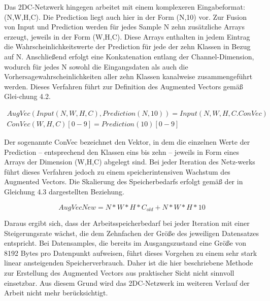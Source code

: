 Das 2DC-Netzwerk hingegen arbeitet mit einem komplexeren Eingabeformat: (N,W,H,C). Die Prediction liegt auch hier in der 
Form (N,10) vor. Zur Fusion von Input und Prediction werden für jedes Sample N zehn zusätzliche Arrays erzeugt, jeweils in der 
Form (W,H,C). Diese Arrays enthalten in jedem Eintrag die Wahrscheinlichkeitswerte der Prediction für jede der zehn Klassen in Bezug auf N. 
Anschließend erfolgt eine Konkatenation entlang der Channel-Dimension, wodurch für jedes N sowohl die Eingangsdaten als auch die 
Vorhersagewahrscheinlichkeiten aller zehn Klassen kanalweise zusammengeführt werden. Dieses Verfahren 
führt zur Definition des Augmented Vectors gemäß Glei-chung 4.2.

\begin{multline}
    AugVec(Input(N, W, H, C), Prediction(N, 10)) = Input(N, W, H, C.ConVec)\\
    ConVec(W, H, C)[0-9] = Prediction(10)[0-9]
\end{multline}

Der sogenannte ConVec bezeichnet den Vektor, in dem die einzelnen Werte der Prediction – entsprechend den Klassen eins bis zehn – jeweils in 
Form eines Arrays der Dimension (W,H,C) abgelegt sind. Bei jeder Iteration des Netz-werks führt dieses Verfahren jedoch zu einem 
speicherintensiven Wachstum des Augmented Vectors. Die Skalierung des Speicherbedarfs erfolgt gemäß der in Gleichung 4.3 dargestellten Beziehung.

\begin{equation}
    AugVecNew = N*W*H*C_{old} + N*W*H*10
\end{equation}

Daraus ergibt sich, dass der Arbeitsspeicherbedarf bei jeder Iteration mit einer Steigerungsrate wächst, die dem Zehnfachen der Größe des 
jeweiligen Datensatzes entspricht. Bei Datensamples, die bereits im Ausgangszustand eine Größe von 8192 Bytes pro Datenpunkt aufweisen, führt 
dieses Vorgehen zu einem sehr stark linear ansteigenden Speicherverbrauch. Daher ist die hier beschriebene Methode zur Erstellung des Augmented Vectors aus 
praktischer Sicht nicht sinnvoll einsetzbar. Aus diesem Grund wird das 2DC-Netzwerk im weiteren Verlauf der Arbeit nicht mehr berücksichtigt.
